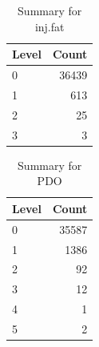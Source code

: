 \begin{table}[ht]
\centering
\begin{tabular}{lr}
  \hline
Level & Count \\ 
  \hline
0 & 36439 \\ 
  1 & 613 \\ 
  2 &  25 \\ 
  3 &   3 \\ 
   \hline
\end{tabular}
\caption{Summary for inj.fat} 
\label{tab: inj.fat}
\end{table}
\begin{table}[ht]
\centering
\begin{tabular}{lr}
  \hline
Level & Count \\ 
  \hline
0 & 35587 \\ 
  1 & 1386 \\ 
  2 &  92 \\ 
  3 &  12 \\ 
  4 &   1 \\ 
  5 &   2 \\ 
   \hline
\end{tabular}
\caption{Summary for PDO} 
\label{tab: PDO}
\end{table}
